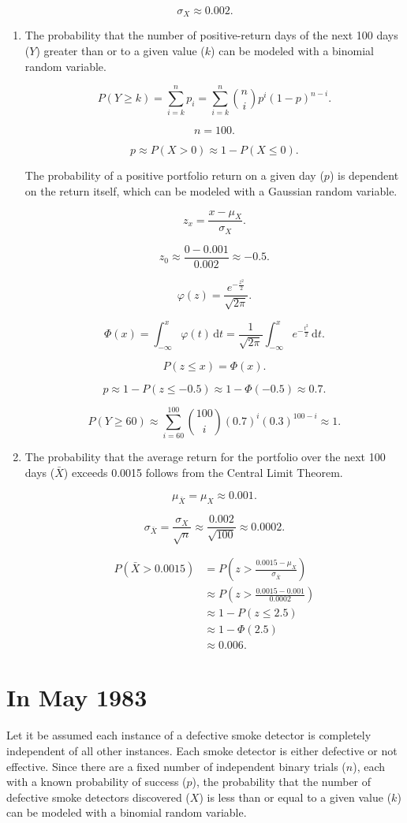 \documentclass[12pt]{article}
\begin{document}
\[\sigma_X\approx 0.002.\]
\begin{enumerate}
\item The probability that the number of positive-return days of the next 100 days ($Y$) greater than or to a given value ($k$) can be modeled with a binomial random variable.

\[P(Y\geq k)=\sum^{n}_{i=k}{p_i}=\sum^{n}_{i=k}{{\binom{n}{i}}p^i(1-p)^{n-i}}.\]

\[n=100.\]

\[p\approx P(X>0)\approx 1-P(X\leq 0).\]

The probability of a positive portfolio return on a given day ($p$) is dependent on the return itself, which can be modeled with a Gaussian random variable.

\[z_x=\frac{x-\mu_X}{\sigma_X}.\]

\[z_0\approx\frac{0-0.001}{0.002}\approx -0.5.\]

\[\varphi(z)=\frac{e^{-\frac{z^2}{2}}}{\sqrt{2\pi}}.\]

\[\Phi(x)=\int^x_{-\infty}{\varphi(t)\,\mathrm{d}t}=\frac{1}{\sqrt{2\pi}}\int^x_{-\infty}{e^{-\frac{t^2}{2}}\,\mathrm{d}t}.\]

\[P(z\leq x)=\Phi(x).\]

\[p\approx 1-P(z\leq -0.5)\approx 1-\Phi(-0.5)\approx 0.7.\]

\[P(Y\geq 60)\approx\sum^{100}_{i=60}{{\binom{100}{i}}(0.7)^i(0.3)^{100-i}}\approx1.\]

\item The probability that the average return for the portfolio over the next 100 days ($\bar{X}$) exceeds 0.0015 follows from the Central Limit Theorem.

\[\mu_{\bar{X}}=\mu_X\approx 0.001.\]

\[\sigma_{\bar{X}}=\frac{\sigma_X}{\sqrt{n}}\approx\frac{0.002}{\sqrt{100}}\approx 0.0002.\]

\begin{align*}
P(\bar{X}>0.0015)
&=P\left(z>\frac{0.0015-\mu_X}{\sigma_{\bar{X}}}\right)\\
&\approx P\left(z>\frac{0.0015-0.001}{0.0002}\right)\\
&\approx 1-P(z\leq 2.5)\\
&\approx 1-\Phi(2.5)\\
&\approx 0.006.
\end{align*}
\end{enumerate}
\section{In May 1983}
Let it be assumed each instance of a defective smoke detector is completely independent of all other instances. Each smoke detector is either defective or not effective. Since there are a fixed number of independent binary trials ($n$), each with a known probability of success ($p$), the probability that the number of defective smoke detectors discovered ($X$) is less than or equal to a given value ($k$) can be modeled with a binomial random variable.
\end{document}
